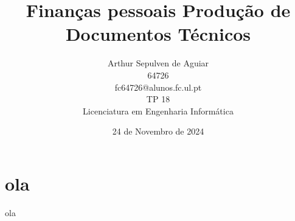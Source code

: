 \documentclass[a4paper,11pt]{article}
\title{Finanças pessoais  Produção de Documentos Técnicos}
\date{24 de Novembro de 2024}
\author{
	Arthur Sepulven de Aguiar \\ 
	64726 \\
	fc64726@alunos.fc.ul.pt \\
	TP 18 \\
	Licenciatura em Engenharia Informática
}
\begin{document}
	\maketitle

	\section{ola}
		ola
\end{document}

